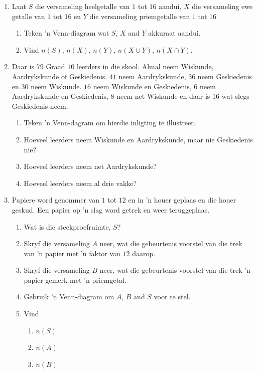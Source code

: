 \begin{exercises}{}
{
  \begin{enumerate}[itemsep=5pt, label=\textbf{\arabic*}.]
  \item  Laat $S$ die versameling heelgetalle van $1$ tot $16$ aandui, $X$
    die versameling ewe getalle van $1$ tot $16$ en $Y$ die versameling priemgetalle van $1$ tot $16$
    \begin{enumerate}[noitemsep, label=\textbf{(\alph*)} ]
    \item Teken 'n Venn-diagram wat $S$, $X$ and $Y$ akkuraat aandui.
    \item Vind $n\left(S\right)$, $n\left(X\right)$, $n\left(Y\right)$,
      $n\left(X\cup Y\right)$, $n\left(X\cap Y\right)$.
    \end{enumerate}
  \item Daar is $79$ Graad $10$ leerders in die skool. Almal neem Wiskunde, Aardrykskunde of Geskiedenis. $41$ neem Aardrykskunde, $36$ neem Geskiedenis en $30$ neem Wiskunde. $16$ neem Wiskunde en Geskiedenis, $6$ neem Aardrykskunde en Geskiedenis, $8$ neem net Wiskunde en daar is $16$ wat slegs Geskiedenis neem.
    \begin{enumerate}[noitemsep, label=\textbf{(\alph*)} ]
    \item Teken 'n Venn-dagram om hierdie inligting te illustreer.
    \item Hoeveel leerders neem Wiskunde en Aardrykskunde, maar nie Geskiedenis nie?
    \item Hoeveel leerders neem net Aardrykskunde?
    \item Hoeveel leerders neem al drie vakke?
    \end{enumerate}
  \item Papiere word genommer van $1$ tot $12$ en in 'n houer geplaas en die houer geskud. Een papier op 'n slag word getrek en weer teruggeplaas.
    \begin{enumerate}[noitemsep, label=\textbf{(\alph*)} ]
    \item Wat is die steekproefruimte, $S$?
    \item Skryf die versameling $A$ neer, wat die gebeurtenis voorstel van die trek van 'n papier met 'n faktor van $12$ daarop.
    \item Skryf die versameling $B$ neer, wat die gebeurtenis voorstel van die trek 'n papier gemerk met 'n priemgetal.
    \item Gebruik 'n Venn-diagram om $A$, $B$ and $S$ voor te stel.
    \item Vind
      \begin{enumerate}[noitemsep, label=\textbf{\roman*.} ]
      \item $n\left(S\right)$
      \item $n\left(A\right)$
      \item $n\left(B\right)$


\end{enumerate}
\end{enumerate}
\end{enumerate}}
\end{exercises}
